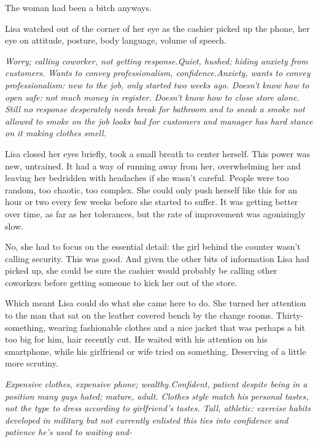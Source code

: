 The woman had been a bitch anyways.



Lisa watched out of the corner of her eye as the cashier picked up the phone, her eye on attitude, posture, body language, volume of speech.



\emph{Worry; calling coworker, not getting response.}\emph{Quiet, hushed; hiding anxiety from customers.  Wants to convey professionalism, confidence.}\emph{Anxiety, wants to convey professionalism: new to the job, only started two weeks ago.  Doesn't know how to open safe: not much money in register.  Doesn't know how to close store alone.  Still no response desperately needs break for bathroom and to sneak a smoke not allowed to smoke on the job looks bad for customers and manager has hard stance on it making clothes smell.}



Lisa closed her eyes briefly, took a small breath to center herself.  This power was new, untrained.  It had a way of running away from her, overwhelming her and leaving her bedridden with headaches if she wasn't careful.  People were too random, too chaotic, too complex.  She could only push herself like this for an hour or two every few weeks before she started to suffer.  It was getting better over time, as far as her tolerances, but the rate of improvement was agonizingly slow.



No, she had to focus on the essential detail: the girl behind the counter wasn't calling security.  This was good.  And given the other bits of information Lisa had picked up, she could be sure the cashier would probably be calling other coworkers before getting someone to kick her out of the store.



Which meant Lisa could do what she came here to do.  She turned her attention to the man that sat on the leather covered bench by the change rooms.  Thirty-something, wearing fashionable clothes and a nice jacket that was perhaps a bit too big for him, hair recently cut.  He waited with his attention on his smartphone, while his girlfriend or wife tried on something.  Deserving of a little more scrutiny.



\emph{Expensive clothes, expensive phone; wealthy.}\emph{Confident, patient despite being in a position many guys hated; mature, adult.  Clothes style match his personal tastes, not the type to dress according to girlfriend's tastes. Tall, athletic: exercise habits developed in military but not currently enlisted this ties into confidence and patience he's used to waiting and-}



